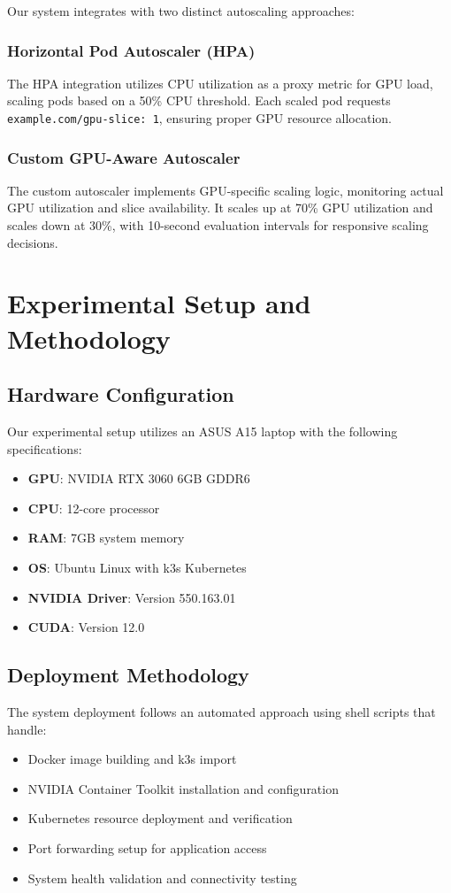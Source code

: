 \documentclass[10pt,twocolumn,letterpaper]{article}
\begin{document}
Our system integrates with two distinct autoscaling approaches:

\subsubsection{Horizontal Pod Autoscaler (HPA)}
The HPA integration utilizes CPU utilization as a proxy metric for GPU load, scaling pods based on a 50\% CPU threshold. Each scaled pod requests \texttt{example.com/gpu-slice: 1}, ensuring proper GPU resource allocation.

\subsubsection{Custom GPU-Aware Autoscaler}
The custom autoscaler implements GPU-specific scaling logic, monitoring actual GPU utilization and slice availability. It scales up at 70\% GPU utilization and scales down at 30\%, with 10-second evaluation intervals for responsive scaling decisions.

\section{Experimental Setup and Methodology}

\subsection{Hardware Configuration}

Our experimental setup utilizes an ASUS A15 laptop with the following specifications:

\begin{itemize}
\item \textbf{GPU}: NVIDIA RTX 3060 6GB GDDR6
\item \textbf{CPU}: 12-core processor  
\item \textbf{RAM}: 7GB system memory
\item \textbf{OS}: Ubuntu Linux with k3s Kubernetes
\item \textbf{NVIDIA Driver}: Version 550.163.01
\item \textbf{CUDA}: Version 12.0
\end{itemize}

\subsection{Deployment Methodology}

The system deployment follows an automated approach using shell scripts that handle:
\begin{itemize}
\item Docker image building and k3s import
\item NVIDIA Container Toolkit installation and configuration
\item Kubernetes resource deployment and verification
\item Port forwarding setup for application access
\item System health validation and connectivity testing
\end{itemize}
\end{document}
